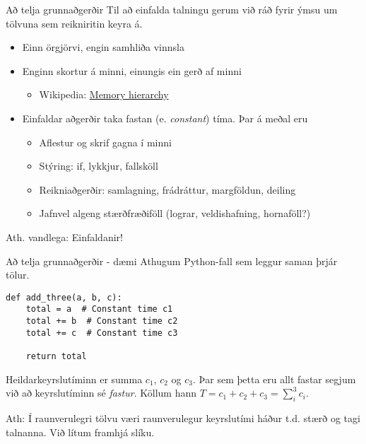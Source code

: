 \documentclass{beamer}
\begin{document}
\begin{frame}{Að telja grunnaðgerðir}
Til að einfalda talningu gerum við ráð fyrir ýmsu um tölvuna sem reikniritin keyra á.
\begin{itemize}
 \item Einn örgjörvi, engin samhliða vinnsla
 \item Enginn skortur á minni, einungis ein gerð af minni
 \begin{itemize}
  \item Wikipedia: \href{http://en.wikipedia.org/wiki/Memory_hierarchy}{Memory hierarchy}
 \end{itemize}
 \item Einfaldar aðgerðir taka fastan (e. \emph{constant}) tíma. Þar á meðal eru
 \begin{itemize}
  \item Aflestur og skrif gagna í minni
  \item Stýring: if, lykkjur, fallsköll
  \item Reikniaðgerðir: samlagning, frádráttur, margföldun, deiling
  \item Jafnvel algeng stærðfræðiföll (lograr, veldishafning, hornaföll?)
 \end{itemize}
\end{itemize}
Ath. vandlega: Einfaldanir!
\end{frame}

\begin{frame}[fragile]{Að telja grunnaðgerðir - dæmi}
Athugum Python-fall sem leggur saman þrjár tölur.

\begin{verbatim}
def add_three(a, b, c):
    total = a  # Constant time c1
    total += b  # Constant time c2
    total += c  # Constant time c3

    return total
\end{verbatim}

Heildarkeyrslutíminn er summa $c_1$, $c_2$ og $c_3$. Þar sem þetta eru allt fastar segjum við að keyrslutíminn sé \emph{fastur}. Köllum hann $T = c_1 + c_2 + c_3 = \sum_i^3 c_i$.

Ath: Í raunverulegri tölvu væri raunverulegur keyrslutími háður t.d. stærð og tagi talnanna. Við lítum framhjá slíku.
\end{frame}
\end{document}
